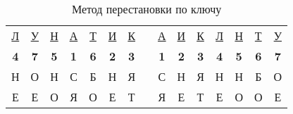 \begin{table} [htbp]%
  \centering
  \parbox{12cm}%
  {%
    \caption{Метод перестановки по ключу}%
    \label{tabl:tab2x2}%
    \begin{SingleSpace}
      \begin{tabular}{ccccccccccccccc}
      \cline{1-7} \cline{9-15}
      \multicolumn{1}{|c|}{{\ul Л}}    & \multicolumn{1}{c|}{{\ul У}}    & \multicolumn{1}{c|}{{\ul Н}}    & \multicolumn{1}{c|}{{\ul А}}    & \multicolumn{1}{c|}{{\ul Т}}    & \multicolumn{1}{c|}{{\ul И}}    & \multicolumn{1}{c|}{{\ul К}}    & \multicolumn{1}{c|}{} & \multicolumn{1}{c|}{{\ul А}}    & \multicolumn{1}{c|}{{\ul И}}    & \multicolumn{1}{c|}{{\ul К}}    & \multicolumn{1}{c|}{{\ul Л}}    & \multicolumn{1}{c|}{{\ul Н}}    & \multicolumn{1}{c|}{{\ul Т}}    & \multicolumn{1}{c|}{{\ul У}}    \\ \cline{1-7} \cline{9-15}
      \multicolumn{1}{|c|}{\textbf{4}} & \multicolumn{1}{c|}{\textbf{7}} & \multicolumn{1}{c|}{\textbf{5}} & \multicolumn{1}{c|}{\textbf{1}} & \multicolumn{1}{c|}{\textbf{6}} & \multicolumn{1}{c|}{\textbf{2}} & \multicolumn{1}{c|}{\textbf{3}} & \multicolumn{1}{c|}{} & \multicolumn{1}{c|}{\textbf{1}} & \multicolumn{1}{c|}{\textbf{2}} & \multicolumn{1}{c|}{\textbf{3}} & \multicolumn{1}{c|}{\textbf{4}} & \multicolumn{1}{c|}{\textbf{5}} & \multicolumn{1}{c|}{\textbf{6}} & \multicolumn{1}{c|}{\textbf{7}} \\ \cline{1-7} \cline{9-15}
      \multicolumn{1}{|c|}{Н}          & \multicolumn{1}{c|}{О}          & \multicolumn{1}{c|}{Н}          & \multicolumn{1}{c|}{С}          & \multicolumn{1}{c|}{Б}          & \multicolumn{1}{c|}{Н}          & \multicolumn{1}{c|}{Я}          & \multicolumn{1}{c|}{} & \multicolumn{1}{c|}{С}          & \multicolumn{1}{c|}{Н}          & \multicolumn{1}{c|}{Я}          & \multicolumn{1}{c|}{Н}          & \multicolumn{1}{c|}{Н}          & \multicolumn{1}{c|}{Б}          & \multicolumn{1}{c|}{О}          \\ \cline{1-7} \cline{9-15}
      \multicolumn{1}{|c|}{Е}          & \multicolumn{1}{c|}{Е}          & \multicolumn{1}{c|}{О}          & \multicolumn{1}{c|}{Я}          & \multicolumn{1}{c|}{О}          & \multicolumn{1}{c|}{Е}          & \multicolumn{1}{c|}{Т}          & \multicolumn{1}{c|}{} & \multicolumn{1}{c|}{Я}          & \multicolumn{1}{c|}{Е}          & \multicolumn{1}{c|}{Т}          & \multicolumn{1}{c|}{Е}          & \multicolumn{1}{c|}{О}          & \multicolumn{1}{c|}{О}          & \multicolumn{1}{c|}{Е}          \\ \cline{1-7} \cline{9-15}

\end{tabular}
\end{SingleSpace}}
\end{table}
